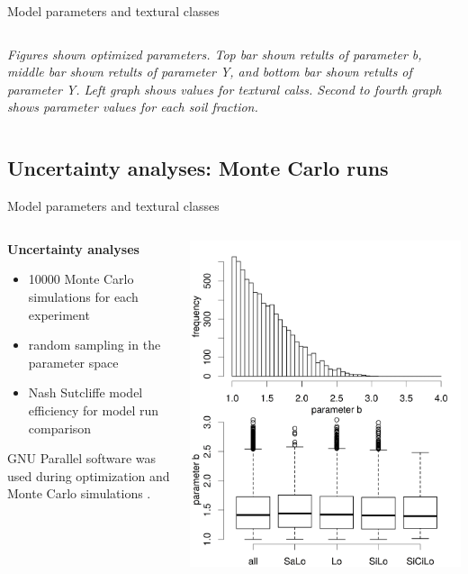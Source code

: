 \begin{block}{Model parameters and textural classes}
\begin{columns}
\begin{column}{0.8\textwidth}
        {\it Figures shown optimized parameters. Top bar shown retults of parameter b, middle bar shown retults of parameter Y, and bottom bar shown retults of parameter Y. Left graph shows values for textural calss. Second to fourth graph shows parameter values for each soil fraction.}
    \end{column}
\end{columns} 

\end{block}

% 
\subsection{Uncertainty analyses: Monte Carlo runs}
\begin{block}{Model parameters and textural classes}
\begin{columns}
    \begin{column}{0.25\textwidth}
        {\bf Uncertainty analyses}
        \begin{itemize}
            \item 10000 Monte Carlo simulations for each experiment
            \item random sampling in the parameter space
            \item Nash Sutcliffe model efficiency for model run comparison
        \end{itemize}
        GNU Parallel software was used during optimization and Monte Carlo simulations \citep{Tange2011a}. 
        \end{column}
        \begin{column}{0.25\textwidth}
            \includegraphics[width = \textwidth]{obr/mc_b.png}

\end{column}
\end{columns}
\end{block}
